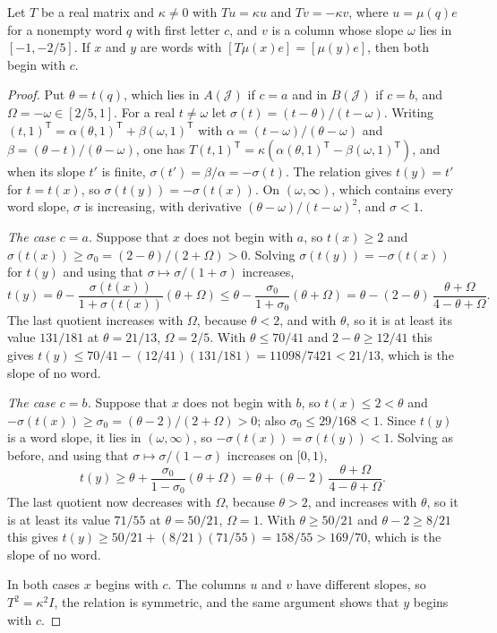 \begin{lemma}
\label{lem:centre-one-letter}
Let $T$ be a real matrix and $\kappa\neq0$ with $Tu=\kappa u$ and $Tv=-\kappa v$, where $u=\mu(q)e$
for a nonempty word $q$ with first letter $c$, and $v$ is a column whose slope $\omega$ lies in
$[-1,-2/5]$. If $x$ and $y$ are words with $[T\mu(x)e]=[\mu(y)e]$, then both begin with $c$.
\end{lemma}

\begin{proof}
Put $\theta=t(q)$, which lies in $A(\mathcal J)$ if $c=a$ and in $B(\mathcal J)$ if $c=b$, and
$\Omega=-\omega\in[2/5,1]$. For a real $t\neq\omega$ let $\sigma(t)=(t-\theta)/(t-\omega)$. Writing
$(t,1)^{\mathsf T}=\alpha(\theta,1)^{\mathsf T}+\beta(\omega,1)^{\mathsf T}$ with
$\alpha=(t-\omega)/(\theta-\omega)$ and $\beta=(\theta-t)/(\theta-\omega)$, one has
$T(t,1)^{\mathsf T}=\kappa(\alpha(\theta,1)^{\mathsf T}-\beta(\omega,1)^{\mathsf T})$, and when
its slope $t'$ is finite, $\sigma(t')=\beta/\alpha=-\sigma(t)$. The relation gives $t(y)=t'$ for
$t=t(x)$, so $\sigma(t(y))=-\sigma(t(x))$. On $(\omega,\infty)$, which contains every word slope,
$\sigma$ is increasing, with derivative $(\theta-\omega)/(t-\omega)^2$, and $\sigma<1$.

\emph{The case $c=a$.} Suppose that $x$ does not begin with $a$, so $t(x)\geqslant2$ and
$\sigma(t(x))\geqslant\sigma_0=(2-\theta)/(2+\Omega)>0$. Solving $\sigma(t(y))=-\sigma(t(x))$ for
$t(y)$ and using that $\sigma\mapsto\sigma/(1+\sigma)$ increases,
$$
 t(y)=\theta-\frac{\sigma(t(x))}{1+\sigma(t(x))}(\theta+\Omega)
 \leqslant\theta-\frac{\sigma_0}{1+\sigma_0}(\theta+\Omega)
 =\theta-(2-\theta)\,\frac{\theta+\Omega}{4-\theta+\Omega}.
$$
The last quotient increases with $\Omega$, because $\theta<2$, and with $\theta$, so it is at least
its value $131/181$ at $\theta=21/13$, $\Omega=2/5$. With $\theta\leqslant70/41$ and
$2-\theta\geqslant12/41$ this gives
$t(y)\leqslant70/41-(12/41)(131/181)=11098/7421<21/13$, which is the slope of no word.

\emph{The case $c=b$.} Suppose that $x$ does not begin with $b$, so $t(x)\leqslant2<\theta$ and
$-\sigma(t(x))\geqslant\sigma_0=(\theta-2)/(2+\Omega)>0$; also $\sigma_0\leqslant29/168<1$. Since
$t(y)$ is a word slope, it lies in $(\omega,\infty)$, so $-\sigma(t(x))=\sigma(t(y))<1$. Solving as
before, and using that $\sigma\mapsto\sigma/(1-\sigma)$ increases on $[0,1)$,
$$
 t(y)\geqslant\theta+\frac{\sigma_0}{1-\sigma_0}(\theta+\Omega)
 =\theta+(\theta-2)\,\frac{\theta+\Omega}{4-\theta+\Omega}.
$$
The last quotient now decreases with $\Omega$, because $\theta>2$, and increases with $\theta$, so it
is at least its value $71/55$ at $\theta=50/21$, $\Omega=1$. With $\theta\geqslant50/21$ and
$\theta-2\geqslant8/21$ this gives $t(y)\geqslant50/21+(8/21)(71/55)=158/55>169/70$, which is the
slope of no word.

In both cases $x$ begins with $c$. The columns $u$ and $v$ have different slopes, so $T^2=\kappa^2I$,
the relation is symmetric, and the same argument shows that $y$ begins with $c$.
\end{proof}

